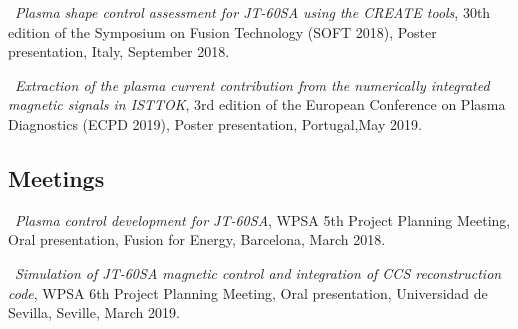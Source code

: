 \textbullet \, \textit{Plasma shape control assessment for JT-60SA using the CREATE tools}, 30th edition of the Symposium on Fusion Technology (SOFT 2018), Poster presentation, Italy, September 2018. 
\smallskip

\textbullet \, \textit{Extraction of the plasma current contribution from the numerically integrated magnetic signals in ISTTOK}, 3rd edition of the European Conference on Plasma Diagnostics (ECPD 2019), Poster presentation, Portugal,May 2019.

\subsection{Meetings}

\textbullet \, \textit{Plasma control development for JT-60SA}, WPSA 5th Project Planning Meeting, Oral presentation, Fusion for Energy, Barcelona, March 2018. 
\smallskip

\textbullet \, \textit{Simulation of JT-60SA magnetic control and integration of CCS reconstruction	code}, WPSA 6th Project Planning Meeting, Oral presentation, Universidad de Sevilla, Seville, March 2019. 



\vfill